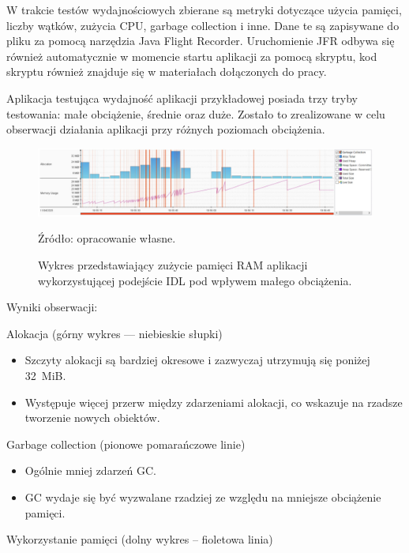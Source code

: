 \documentclass[runningheads,12pt]{llncs}
\begin{document}
W trakcie testów wydajnościowych zbierane są metryki dotyczące użycia pamięci, liczby wątków, zużycia CPU, garbage collection i inne. Dane te są zapisywane do pliku za pomocą narzędzia Java Flight Recorder. Uruchomienie JFR odbywa się również automatycznie w momencie startu aplikacji za pomocą skryptu, kod skryptu również znajduje się w materiałach dołączonych do pracy.

Aplikacja testująca wydajność aplikacji przykładowej posiada trzy tryby testowania: małe obciążenie, średnie oraz duże. Zostało to zrealizowane w celu obserwacji działania aplikacji przy różnych poziomach obciążenia.

\newpage

\begin{figure}
    \includegraphics[width=\linewidth]{images/idl-memory-low-graph.jpg}
    \caption{Wykres przedstawiający zużycie pamięci RAM aplikacji wykorzystującej podejście IDL pod wpływem małego obciążenia.} \label{fig1}
    \vspace{0.5em}
    {\small Źródło: opracowanie własne.}
\end{figure}

Wyniki obserwacji:

Alokacja (górny wykres — niebieskie słupki)

\begin{itemize}
    \item Szczyty alokacji są bardziej okresowe i zazwyczaj utrzymują się poniżej 32~MiB.
    \item Występuje więcej przerw między zdarzeniami alokacji, co wskazuje na rzadsze tworzenie nowych obiektów.
\end{itemize}

Garbage collection (pionowe pomarańczowe linie)

\begin{itemize}
    \item Ogólnie mniej zdarzeń GC.
    \item GC wydaje się być wyzwalane rzadziej ze względu na mniejsze obciążenie pamięci.
\end{itemize}

Wykorzystanie pamięci (dolny wykres – fioletowa linia)
\end{document}
